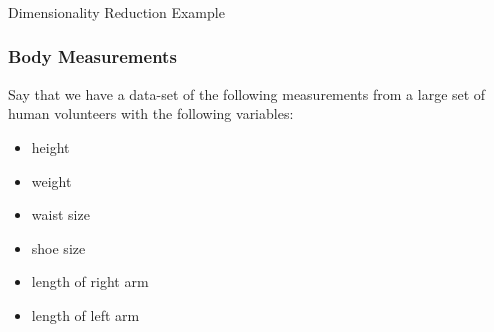 








\begin{frame}[fragile]\frametitle{}
\begin{center}
{\Large Dimensionality Reduction Example}
\end{center}
\end{frame}

\begin{frame}[fragile] \frametitle{Body Measurements}

Say that we have a data-set of the following measurements from
a large set of human volunteers with the following variables:
\begin{itemize}
\item height
\item weight
\item waist size
\item shoe size
\item length of right arm
\item length of left arm

\end{itemize}

\end{frame}

